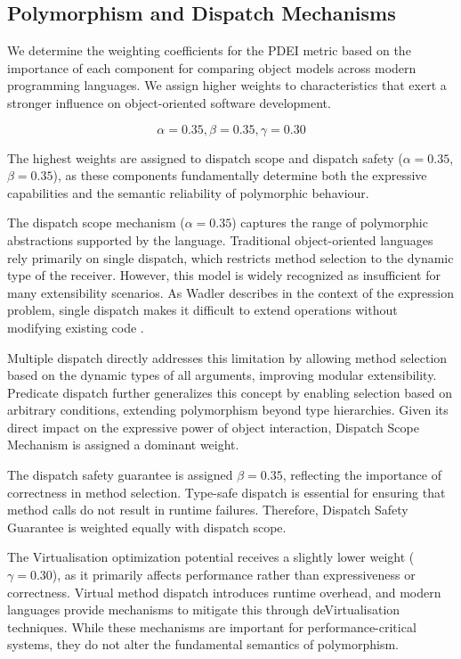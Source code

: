 \subsection{Polymorphism and Dispatch Mechanisms}

We determine the weighting coefficients for the PDEI metric based on the importance of each component for comparing object models across modern programming languages. We assign higher weights to characteristics that exert a stronger influence on object-oriented software development.

\[
\alpha = 0.35, \beta = 0.35, \gamma = 0.30
\]

The highest weights are assigned to dispatch scope and dispatch safety ($\alpha = 0.35$, $\beta = 0.35$), as these components fundamentally determine both the expressive capabilities and the semantic reliability of polymorphic behaviour.

The dispatch scope mechanism ($\alpha = 0.35$) captures the range of polymorphic abstractions supported by the language. Traditional object-oriented languages rely primarily on single dispatch, which restricts method selection to the dynamic type of the receiver. However, this model is widely recognized as insufficient for many extensibility scenarios. As Wadler describes in the context of the expression problem, single dispatch makes it difficult to extend operations without modifying existing code \cite{wadler1998expression}. 

Multiple dispatch directly addresses this limitation by allowing method selection based on the dynamic types of all arguments, improving modular extensibility. Predicate dispatch further generalizes this concept by enabling selection based on arbitrary conditions, extending polymorphism beyond type hierarchies. Given its direct impact on the expressive power of object interaction, Dispatch Scope Mechanism is assigned a dominant weight.

The dispatch safety guarantee is assigned $\beta = 0.35$, reflecting the importance of correctness in method selection. Type-safe dispatch is essential for ensuring that method calls do not result in runtime failures.  Therefore, Dispatch Safety Guarantee is weighted equally with dispatch scope.

The Virtualisation optimization potential receives a slightly lower weight ($\gamma = 0.30$), as it primarily affects performance rather than expressiveness or correctness. Virtual method dispatch introduces runtime overhead, and modern languages provide mechanisms to mitigate this through deVirtualisation techniques.  While these mechanisms are important for performance-critical systems, they do not alter the fundamental semantics of polymorphism.

